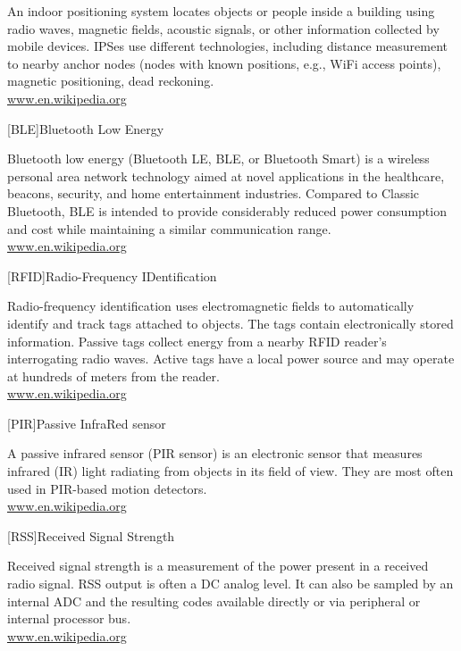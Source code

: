 \begin{acronym}[OpenFOAM]
{\smaller An indoor positioning system locates objects or people inside a building using radio waves, magnetic fields, acoustic signals, or other information collected by mobile devices.
IPSes use different technologies, including distance measurement to nearby anchor nodes (nodes with known positions, e.g., WiFi access points), magnetic positioning, dead reckoning.\\
\href{https://en.wikipedia.org/wiki/Indoor_positioning_system}{www.en.wikipedia.org}
\par}
%
%
%
[BLE]{Bluetooth Low Energy}

{\smaller Bluetooth low energy (Bluetooth LE, BLE, or Bluetooth Smart) is a wireless personal area network technology aimed at novel applications in the healthcare, beacons, security, and home entertainment industries. Compared to Classic Bluetooth, BLE is intended to provide considerably reduced power consumption and cost while maintaining a similar communication range.\\
\href{https://en.wikipedia.org/wiki/Bluetooth_low_energy}{www.en.wikipedia.org}
\par}


[RFID]{Radio-Frequency IDentification}

{\smaller Radio-frequency identification uses electromagnetic fields to automatically identify and track tags attached to objects. The tags contain electronically stored information. Passive tags collect energy from a nearby RFID reader's interrogating radio waves. Active tags have a local power source and may operate at hundreds of meters from the reader.\\
\href{https://en.wikipedia.org/wiki/Radio-frequency_identification}{www.en.wikipedia.org}
\par}


[PIR]{Passive InfraRed sensor}

{\smaller A passive infrared sensor (PIR sensor) is an electronic sensor that measures infrared (IR) light radiating from objects in its field of view. They are most often used in PIR-based motion detectors.\\
\href{https://en.wikipedia.org/wiki/Passive_infrared_sensor}{www.en.wikipedia.org}
\par}

[RSS]{Received Signal Strength}

{\smaller Received signal strength is a measurement of the power present in a received radio signal. RSS output is often a DC analog level. It can also be sampled by an internal ADC and the resulting codes available directly or via peripheral or internal processor bus.\\
\href{https://en.wikipedia.org/wiki/Received_signal_strength_indication}{www.en.wikipedia.org}
\par}


\end{acronym}
